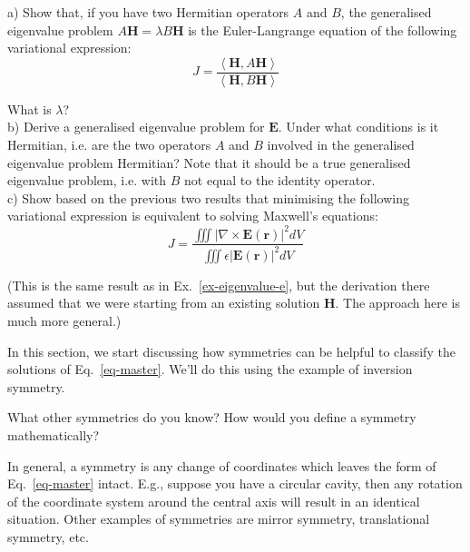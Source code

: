 \begin{exer}
   
a) Show that, if you have two Hermitian operators $A$ and $B$, the generalised eigenvalue problem $A {\mathbf H} = \lambda B {\mathbf H}$ is the Euler-Langrange equation of the following variational expression: \\

$$J = \frac{\left\langle {\mathbf H} , A {\mathbf H}\right\rangle}{\left\langle {\mathbf H} , B {\mathbf H}\right\rangle}$$

What is $\lambda$? \\

b) Derive a generalised eigenvalue problem for $\mathbf E$. Under what conditions is it Hermitian, i.e. are the two operators $A$ and $B$ involved in the generalised eigenvalue problem Hermitian? Note that it should be a true generalised eigenvalue problem, i.e. with $B$ not equal to the identity operator.  \\

c) Show based on the previous two results that minimising the following variational expression is equivalent to solving Maxwell's equations: \\

$$J=\frac{\iiint \left| \nabla \times {\mathbf E ({\mathbf r})} \right| ^2  dV} {\iiint \epsilon \left| {\mathbf E ({\mathbf r})} \right| ^2  dV}$$


(This is the same result as in Ex.~\ref{ex-eigenvalue-e}, but the derivation there assumed that we were starting from an existing solution $\mathbf H$. The approach here is much more general.)

\end{exer}


\pagebreak



In this section, we start discussing how symmetries can be helpful to classify the solutions of Eq.~\ref{eq-master}. We'll do this using the example of inversion symmetry.

\begin{cue}
What other symmetries do you know? How would you define a symmetry mathematically?  
\end{cue}

In general, a symmetry is any change of coordinates which leaves the form of Eq.~\ref{eq-master} intact. E.g., suppose you have a circular cavity, then any rotation of the coordinate system around the central axis will result in an identical situation. Other examples of symmetries are mirror symmetry, translational symmetry, etc. 

